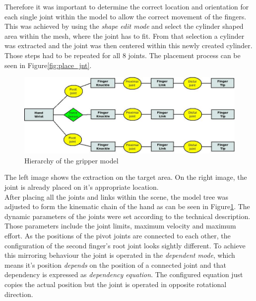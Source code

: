 Therefore it was important to determine the correct location and orientation for each single joint within the model to allow the correct movement of the fingers. This was achieved by using the \emph{shape edit mode} and select the cylinder shaped area within the mesh, where the joint has to fit. From that selection a cylinder was extracted and the joint was then centered within this newly created cylinder. Those steps had to be repeated for all 8 joints. The placement process can be seen in Figure\ref{fig:place_jnt}.
\begin{figure}[b]
	\centering
  	\includegraphics[width=1.0\textwidth]{images/hand_tree.jpg}
	\caption{Hierarchy of the gripper model}
	\label{fig:hand_tree}
\end{figure}
The left image shows the extraction on the target area. On the right image, the joint is already placed on it's appropriate location.\\

After placing all the joints and links within the scene, the model tree was adjusted to form the kinematic chain of the hand as can be seen in Figure\ref{fig:hand_tree}. The dynamic parameters of the joints were set according to the technical description. Those parameters include the joint limits, maximum velocity and maximum effort. As the positions of the pivot joints are connected to each other, the configuration of the second finger's root joint looks sightly different. To achieve this mirroring behaviour the joint is operated in the \emph{dependent mode}, which means it's position \emph{depends} on the position of a connected joint and that dependency is expressed as \emph{dependency equation}. The configured equation just copies the actual position but the joint is operated in opposite rotational direction.\\

